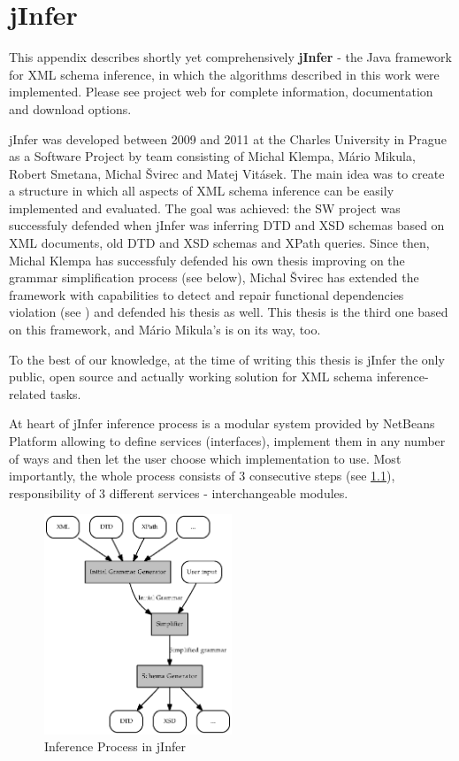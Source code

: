 \chapter{jInfer}
\label{appendix-jInfer}

This appendix describes shortly yet comprehensively \textbf{jInfer} - the Java framework for XML schema inference, in which the algorithms described in this work were implemented. Please see project web \cite{jinferweb} for complete information, documentation and download options.

jInfer was developed between 2009 and 2011 at the Charles University in Prague as a Software Project by team consisting of Michal Klempa, Mário Mikula, Ro\-bert Sme\-ta\-na, Michal Švirec and Matej Vitásek. The main idea was to create a structure in which all aspects of XML schema inference can be easily implemented and evaluated. The goal was achieved: the SW project was successfuly defended when jInfer was inferring DTD and XSD schemas based on XML documents, old DTD and XSD schemas and XPath queries. Since then, Michal Klempa has successfuly defended his own thesis improving on the grammar simplification process (see below), Michal Švirec has extended the framework with capabilities to detect and repair functional dependencies violation (see \cite{sviro}) and defended his thesis as well. This thesis is the third one based on this framework, and Mário Mikula's is on its way, too.

To the best of our knowledge, at the time of writing this thesis is jInfer the only public, open source and actually working solution for XML schema inference-related tasks.

At heart of jInfer inference process is a modular system provided by NetBeans Platform allowing to define services (interfaces), implement them in any number of ways and then let the user choose which implementation to use. Most importantly, the whole process consists of 3 consecutive steps (see \ref{image-inference-process}), responsibility of 3 different services - interchangeable modules.

\begin{figure}
  \caption{Inference Process in jInfer}
  \vspace{10pt}
  \label{image-inference-process}
  \centering
    \includegraphics[width=0.5\textwidth]{images/inference-process}
\end{figure}

